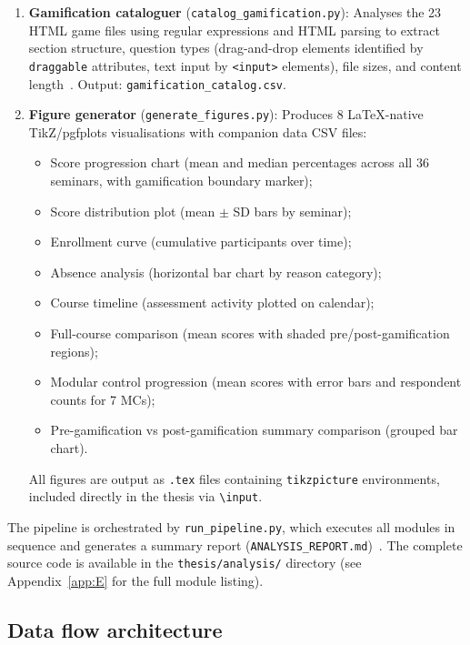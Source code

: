 \begin{enumerate}
\item \textbf{Gamification cataloguer} (\texttt{catalog\_gamification.py}): Analyses the 23 HTML game files using regular expressions and HTML parsing to extract section structure, question types (drag-and-drop elements identified by \texttt{draggable} attributes, text input by \texttt{<input>} elements), file sizes, and content length~\cite{KorniienkoSemerikov2024}. Output: \texttt{gamification\_catalog.csv}.

\item \textbf{Figure generator} (\texttt{generate\_figures.py}): Produces 8 LaTeX-native TikZ/pgfplots visualisations with companion data CSV files:
\begin{itemize}
\item Score progression chart (mean and median percentages across all 36 seminars, with gamification boundary marker);
\item Score distribution plot (mean $\pm$ SD bars by seminar);
\item Enrollment curve (cumulative participants over time);
\item Absence analysis (horizontal bar chart by reason category);
\item Course timeline (assessment activity plotted on calendar);
\item Full-course comparison (mean scores with shaded pre/post-gamification regions);
\item Modular control progression (mean scores with error bars and respondent counts for 7 MCs);
\item Pre-gamification vs post-gamification summary comparison (grouped bar chart).
\end{itemize}
All figures are output as \texttt{.tex} files containing \texttt{tikzpicture} environments, included directly in the thesis via \texttt{\textbackslash input}.
\end{enumerate}

The pipeline is orchestrated by \texttt{run\_pipeline.py}, which executes all modules in sequence and generates a summary report (\texttt{ANALYSIS\_REPORT.md})~\cite{KitchenhamCharters2007}. The complete source code is available in the \texttt{thesis/analysis/} directory (see Appendix~\ref{app:E} for the full module listing).

\subsection{Data flow architecture}

